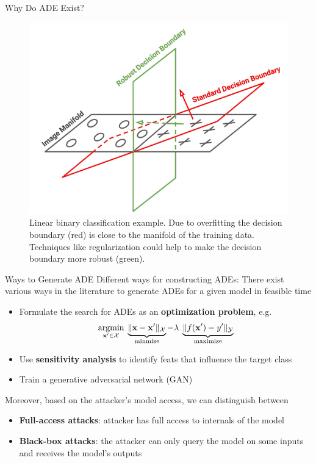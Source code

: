\documentclass[10pt,compress,t,notes=noshow, xcolor=table]{beamer}
\begin{document}
\begin{frame}[c]{Why Do ADE Exist?}
{    \begin{figure}
        \centering
        \includegraphics[width = .35\textwidth]{figure/tilting_ae.png}
        \caption{Linear binary classification example. Due to overfitting the decision boundary (red) is close to the manifold of the training data. Techniques like regularization could help to make the decision boundary more robust (green). 
}
    \end{figure}
}
    
    
\end{frame}


\begin{frame}[c]{Ways to Generate ADE}
Different ways for constructing ADEs:
There exist various ways in the literature to generate ADEs for a given model in feasible time
\begin{itemize}
    \item Formulate the search for ADEs as an \textbf{optimization problem}, e.g. 
    \begin{equation*}
        \label{eq:optimization}
        \underset{\mathbf{x}'\in \mathcal{X}}{\text{argmin}}\; \underbrace{\| \mathbf{x}-\mathbf{x}' \|_{\mathcal{X}}}_{\text{minmize}} - \lambda\;   \underbrace{ \|f(\mathbf{x}')-y'\|_{\mathcal{Y}}}_{\text{maximize}}
    \end{equation*}
    \item Use \textbf{sensitivity analysis} to identify feats that influence the target class
    \item Train a generative adversarial network (GAN) 
\end{itemize}
Moreover, based on the attacker's model access, we can distinguish between
\begin{itemize}
    \item \textbf{Full-access attacks}: attacker has full access to internals of the model
    \item \textbf{Black-box attacks}: the attacker can only query the model on some inputs and receives the model's outputs
\end{itemize}
\end{frame}
\end{document}
